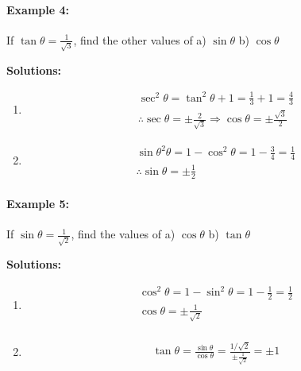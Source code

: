 \documentclass{article}
\begin{document}
\paragraph{Example 4:}
If $\tan\theta = \frac{1}{\sqrt{3}}$, find the other values of a) $\sin\theta$ b) $\cos\theta$

{\scriptsize \textbf{Solutions:}}
\begin{enumerate}[label=\alph*)]
        \item
        \[
        \begin{aligned}
          \sec^{2}\theta = \tan^{2}\theta + 1 = \frac{1}{3}+1 = \frac{4}{3} \\
          \therefore \sec\theta = \pm\frac{2}{\sqrt{3}} \Rightarrow \cos\theta = \pm \frac{\sqrt{3}}{2}
        \end{aligned}
        \]

        \item
        \[
        \begin{aligned}
          \sin\theta^{2}\theta = 1 - \cos^{2}\theta = 1 - \frac{3}{4} = \frac{1}{4} \\
          \therefore \sin\theta = \pm\frac{1}{2}
        \end{aligned}
        \]
\end{enumerate}

\paragraph{Example 5:}
If $\sin\theta = \frac{1}{\sqrt{2}}$, find the values of a) $\cos\theta$ b) $\tan\theta$

{\scriptsize \textbf{Solutions:}}
\begin{enumerate}[label=\alph*)]
        \item
        \[
        \begin{aligned}
          \cos^{2}\theta = 1 - \sin^{2}\theta = 1 - \frac{1}{2} = \frac{1}{2} \\
          \cos\theta = \pm\frac{1}{\sqrt{2}} \\
        \end{aligned}
        \]

        \item
        \[
        \begin{aligned}
          \tan\theta = \frac{\sin\theta}{\cos\theta} = \frac{1/\sqrt{2}}{\pm\frac{1}{\sqrt{2}}} = \pm 1
        \end{aligned}
        \]
\end{enumerate}
\end{document}
